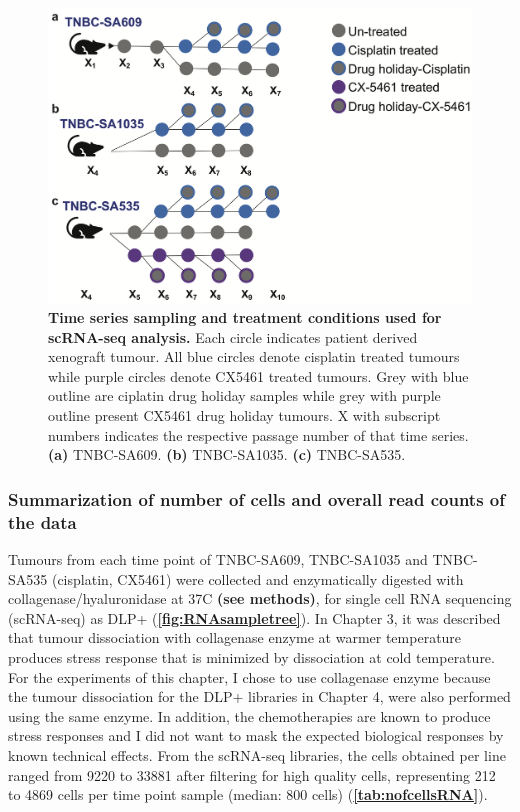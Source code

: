  


\begin{figure}
\centering
\includegraphics[width=\textwidth]{Figures/chap5/SchematicsforRNAsampling.png}
	
\caption[SchematicsforRNAsampling]
	{\small
	\textbf{Time series sampling and treatment conditions used for scRNA-seq analysis.}
	Each circle indicates patient derived xenograft tumour. All blue circles denote cisplatin treated tumours while purple circles denote CX5461 treated tumours. Grey with blue outline are ciplatin drug holiday samples while grey with purple outline present CX5461 drug holiday tumours. X with subscript numbers indicates the respective passage number of that time series. 
	   \textbf{(a)} TNBC-SA609.
	    \textbf{(b)} TNBC-SA1035.
	    \textbf{(c)} TNBC-SA535.
	}
	\label{fig:RNAsampletree}
\end{figure}
 
 
\subsubsection{Summarization of number of cells and overall read counts of the data}
Tumours from each time point of TNBC-SA609, TNBC-SA1035 and TNBC-SA535 (cisplatin, CX5461) were collected and enzymatically digested with collagenase/hyaluronidase at 37\textdegree C \textbf{(see methods)}, for single cell RNA sequencing (scRNA-seq) as DLP+ (\textbf{\autoref{fig:RNAsampletree}}). In Chapter 3, it was described that tumour dissociation with collagenase enzyme at warmer temperature produces stress response that is minimized
by dissociation at cold temperature. For the experiments of this chapter, I chose to use collagenase enzyme because the tumour dissociation for the DLP+ libraries in Chapter 4, were also performed using the same enzyme. In addition, the chemotherapies are known to produce stress responses and I did not want to mask the expected biological responses by known technical effects. 
From the scRNA-seq libraries, the cells obtained per line ranged from 9220 to 33881 after filtering for high quality cells, representing 212 to 4869 cells per time point sample (median: 800 cells) (\textbf{\autoref{tab:nofcellsRNA}}). 

